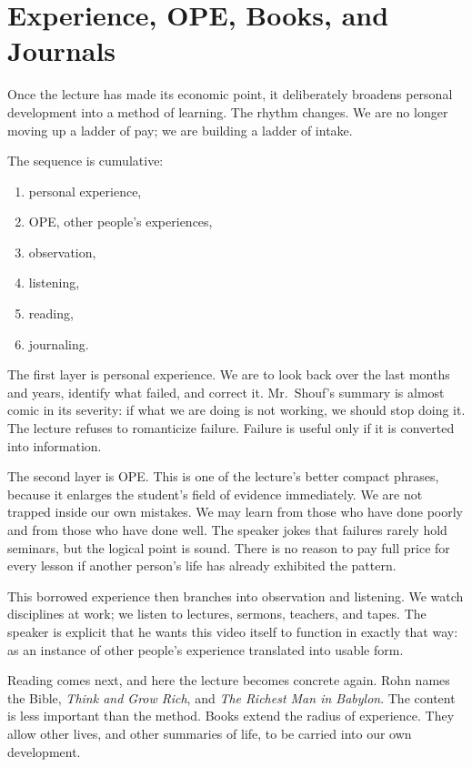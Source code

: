 \section{Experience, OPE, Books, and Journals}

Once the lecture has made its economic point, it deliberately broadens personal development into a method of learning. The rhythm changes. We are no longer moving up a ladder of pay; we are building a ladder of intake.

The sequence is cumulative:
\begin{enumerate}
\item personal experience,
\item OPE, other people's experiences,
\item observation,
\item listening,
\item reading,
\item journaling.
\end{enumerate}

The first layer is personal experience. We are to look back over the last months and years, identify what failed, and correct it. Mr.~Shouf's summary is almost comic in its severity: if what we are doing is not working, we should stop doing it. The lecture refuses to romanticize failure. Failure is useful only if it is converted into information.

The second layer is OPE. This is one of the lecture's better compact phrases, because it enlarges the student's field of evidence immediately. We are not trapped inside our own mistakes. We may learn from those who have done poorly and from those who have done well. The speaker jokes that failures rarely hold seminars, but the logical point is sound. There is no reason to pay full price for every lesson if another person's life has already exhibited the pattern.

This borrowed experience then branches into observation and listening. We watch disciplines at work; we listen to lectures, sermons, teachers, and tapes. The speaker is explicit that he wants this video itself to function in exactly that way: as an instance of other people's experience translated into usable form.

Reading comes next, and here the lecture becomes concrete again. Rohn names the Bible, \emph{Think and Grow Rich}, and \emph{The Richest Man in Babylon}. The content is less important than the method. Books extend the radius of experience. They allow other lives, and other summaries of life, to be carried into our own development.

